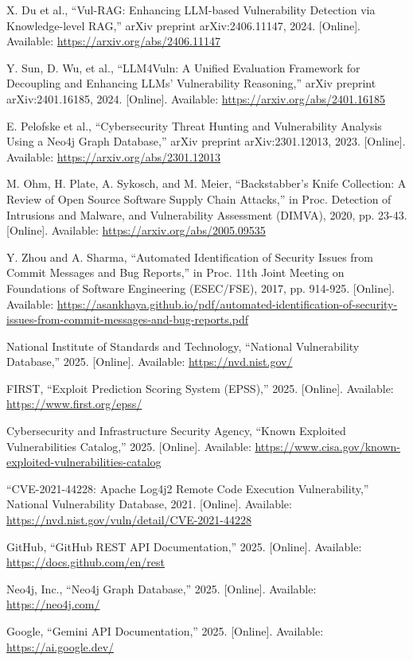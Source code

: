 ﻿\documentclass[conference]{IEEEtran}
\begin{document}
\begin{thebibliography}{00}

 X. Du et al., ``Vul-RAG: Enhancing LLM-based Vulnerability Detection via Knowledge-level RAG,'' arXiv preprint arXiv:2406.11147, 2024. [Online]. Available: \url{https://arxiv.org/abs/2406.11147}

 Y. Sun, D. Wu, et al., ``LLM4Vuln: A Unified Evaluation Framework for Decoupling and Enhancing LLMs' Vulnerability Reasoning,'' arXiv preprint arXiv:2401.16185, 2024. [Online]. Available: \url{https://arxiv.org/abs/2401.16185}

 E. Pelofske et al., ``Cybersecurity Threat Hunting and Vulnerability Analysis Using a Neo4j Graph Database,'' arXiv preprint arXiv:2301.12013, 2023. [Online]. Available: \url{https://arxiv.org/abs/2301.12013}

 M. Ohm, H. Plate, A. Sykosch, and M. Meier, ``Backstabber's Knife Collection: A Review of Open Source Software Supply Chain Attacks,'' in Proc. Detection of Intrusions and Malware, and Vulnerability Assessment (DIMVA), 2020, pp. 23-43. [Online]. Available: \url{https://arxiv.org/abs/2005.09535}

 Y. Zhou and A. Sharma, ``Automated Identification of Security Issues from Commit Messages and Bug Reports,'' in Proc. 11th Joint Meeting on Foundations of Software Engineering (ESEC/FSE), 2017, pp. 914-925. [Online]. Available: \url{https://asankhaya.github.io/pdf/automated-identification-of-security-}\allowbreak\url{issues-from-commit-messages-and-bug-reports.pdf}

 National Institute of Standards and Technology, ``National Vulnerability Database,'' 2025. [Online]. Available: \url{https://nvd.nist.gov/}

 FIRST, ``Exploit Prediction Scoring System (EPSS),'' 2025. [Online]. Available: \url{https://www.first.org/epss/}

 Cybersecurity and Infrastructure Security Agency, ``Known Exploited Vulnerabilities Catalog,'' 2025. [Online]. Available: \url{https://www.cisa.gov/known-exploited-vulnerabilities-catalog}

 ``CVE-2021-44228: Apache Log4j2 Remote Code Execution Vulnerability,'' National Vulnerability Database, 2021. [Online]. Available: \url{https://nvd.nist.gov/vuln/detail/CVE-2021-44228}

 GitHub, ``GitHub REST API Documentation,'' 2025. [Online]. Available: \url{https://docs.github.com/en/rest}

 Neo4j, Inc., ``Neo4j Graph Database,'' 2025. [Online]. Available: \url{https://neo4j.com/}

 Google, ``Gemini API Documentation,'' 2025. [Online]. Available: \url{https://ai.google.dev/}

\end{thebibliography}
\end{document}

